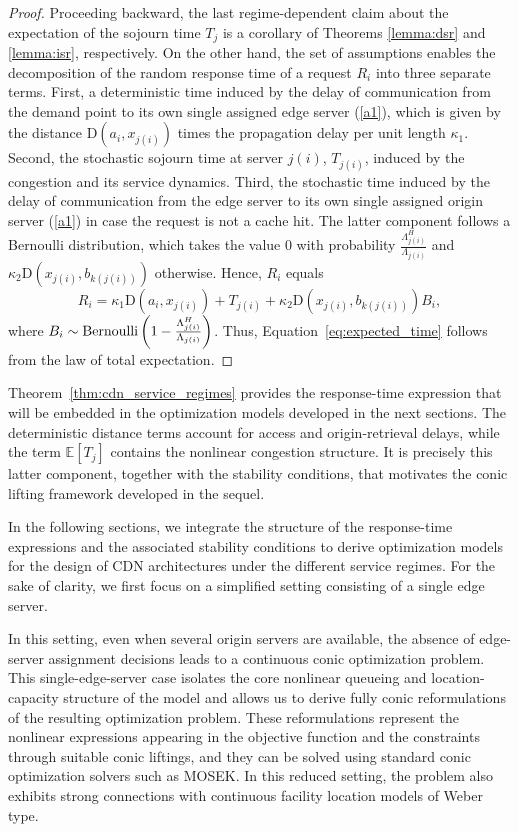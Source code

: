 \documentclass[a4paper,11pt,reqno]{amsart}
\newcommand{\D}{\mathrm{D}}
\begin{document}
\begin{proof}
    Proceeding backward, the last regime-dependent claim about the expectation of the sojourn time $T_j$ is a corollary of Theorems \ref{lemma:dsr} and \ref{lemma:isr}, respectively. On the other hand, the set of assumptions enables the decomposition of the random response time of a request $R_i$ into three separate terms. First, a deterministic time induced by the delay of communication from the demand point to its own single assigned edge server (\ref{a1}), which is given by the distance $\D(a_i,x_{j(i)})$ times the propagation delay per unit length $\kappa_1$. Second, the stochastic sojourn time at server $j(i)$, $T_{j(i)}$, induced by the congestion and its service dynamics. Third, the stochastic time induced by the delay of communication from the edge server to its own single assigned origin server (\ref{a1}) in case the request is not a cache hit. The latter component follows a Bernoulli distribution, which takes the value $0$ with probability $\frac{\Lambda^H_{j(i)}}{\Lambda_{j(i)}}$ and $\kappa_2\D(x_{j(i)},b_{k(j(i))})$ otherwise. Hence, $R_i$ equals
    \begin{equation*}
        R_i = \kappa_1 \D(a_i,x_{j(i)}) + T_{j(i)} + \kappa_2\D(x_{j(i)},b_{k(j(i))})B_i,
    \end{equation*}
    where $B_i\sim {\rm Bernoulli}\left(1-
\frac{\Lambda_{j(i)}^H}{\Lambda_{j(i)}}\right)$. Thus, Equation~\eqref{eq:expected_time} follows from the law of total expectation.
\end{proof}
Theorem~\ref{thm:cdn_service_regimes} provides the response-time expression that will be embedded in the optimization models developed in the next sections. The deterministic distance terms account for access and origin-retrieval delays, while the term $\mathbb{E}[T_j]$ contains the nonlinear congestion structure. It is precisely this latter component, together with the stability conditions, that motivates the conic lifting framework developed in the sequel.

In the following sections, we integrate the structure of the response-time expressions and the associated stability conditions to derive optimization models for the design of CDN architectures under the different service regimes. For the sake of clarity, we first focus on a simplified setting consisting of a single edge server.

In this setting, even when several origin servers are available, the absence of edge-server assignment decisions leads to a continuous conic optimization problem. This single-edge-server case isolates the core nonlinear queueing and location-capacity structure of the model and allows us to derive fully conic reformulations of the resulting optimization problem. These reformulations represent the nonlinear expressions appearing in the objective function and the constraints through suitable conic liftings, and they can be solved using standard conic optimization solvers such as MOSEK. In this reduced setting, the problem also exhibits strong connections with continuous facility location models of Weber type.
\end{document}

